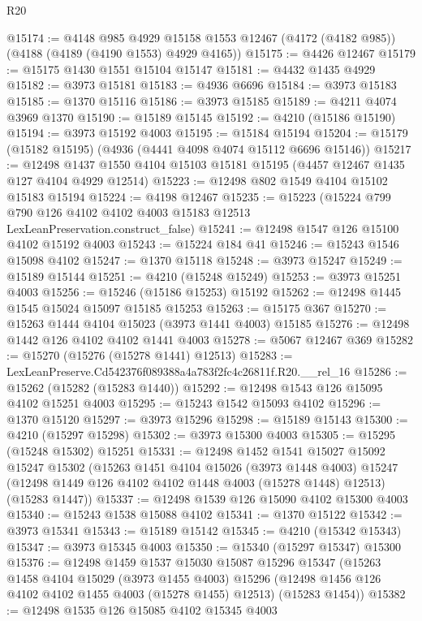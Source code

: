 \begin{lexlean}{R20}
\begin{coremodule}
@15174 := @4148
    @985
    @4929
    @15158
    @1553
    @12467
    (@4172 (@4182 @985))
    (@4188 (@4189 (@4190 @1553) @4929 @4165))
@15175 := @4426 @12467
@15179 := @15175 @1430 @1551 @15104 @15147
@15181 := @4432 @1435 @4929
@15182 := @3973 @15181
@15183 := @4936 @6696
@15184 := @3973 @15183
@15185 := @1370 @15116
@15186 := @3973 @15185
@15189 := @4211 @4074 @3969 @1370
@15190 := @15189 @15145
@15192 := @4210 (@15186 @15190)
@15194 := @3973 @15192 @4003
@15195 := @15184 @15194
@15204 := @15179 (@15182 @15195) (@4936 (@4441 @4098 @4074 @15112 @6696 @15146))
@15217 := @12498 @1437 @1550 @4104 @15103 @15181 @15195 (@4457 @12467 @1435 @127 @4104 @4929 @12514)
@15223 := @12498 @802 @1549 @4104 @15102 @15183 @15194
@15224 := @4198 @12467
@15235 := @15223
    (@15224 @799 @790 @126 @4102 @4102 @4003 @15183 @12513 LexLeanPreservation.construct_false)
@15241 := @12498 @1547 @126 @15100 @4102 @15192 @4003
@15243 := @15224 @184 @41
@15246 := @15243 @1546 @15098 @4102
@15247 := @1370 @15118
@15248 := @3973 @15247
@15249 := @15189 @15144
@15251 := @4210 (@15248 @15249)
@15253 := @3973 @15251 @4003
@15256 := @15246 (@15186 @15253) @15192
@15262 := @12498 @1445 @1545 @15024 @15097 @15185 @15253
@15263 := @15175 @367
@15270 := @15263 @1444 @4104 @15023 (@3973 @1441 @4003) @15185
@15276 := @12498 @1442 @126 @4102 @4102 @1441 @4003
@15278 := @5067 @12467 @369
@15282 := @15270 (@15276 (@15278 @1441) @12513)
@15283 := LexLeanPreserve.Cd542376f089388a4a783f2fc4c26811f.R20.__rel_16
@15286 := @15262 (@15282 (@15283 @1440))
@15292 := @12498 @1543 @126 @15095 @4102 @15251 @4003
@15295 := @15243 @1542 @15093 @4102
@15296 := @1370 @15120
@15297 := @3973 @15296
@15298 := @15189 @15143
@15300 := @4210 (@15297 @15298)
@15302 := @3973 @15300 @4003
@15305 := @15295 (@15248 @15302) @15251
@15331 := @12498
    @1452
    @1541
    @15027
    @15092
    @15247
    @15302
    (@15263
      @1451
      @4104
      @15026
      (@3973 @1448 @4003)
      @15247
      (@12498 @1449 @126 @4102 @4102 @1448 @4003 (@15278 @1448) @12513)
      (@15283 @1447))
@15337 := @12498 @1539 @126 @15090 @4102 @15300 @4003
@15340 := @15243 @1538 @15088 @4102
@15341 := @1370 @15122
@15342 := @3973 @15341
@15343 := @15189 @15142
@15345 := @4210 (@15342 @15343)
@15347 := @3973 @15345 @4003
@15350 := @15340 (@15297 @15347) @15300
@15376 := @12498
    @1459
    @1537
    @15030
    @15087
    @15296
    @15347
    (@15263
      @1458
      @4104
      @15029
      (@3973 @1455 @4003)
      @15296
      (@12498 @1456 @126 @4102 @4102 @1455 @4003 (@15278 @1455) @12513)
      (@15283 @1454))
@15382 := @12498 @1535 @126 @15085 @4102 @15345 @4003

\end{coremodule}
\end{lexlean}
